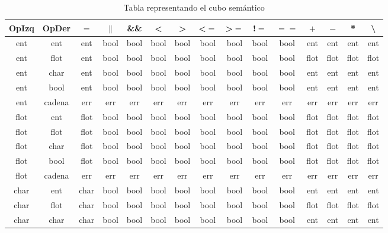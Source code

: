 \begin{table}
    \centering
    \caption{Tabla representando el cubo semántico}
    \small
    \begin{tabular}{||c c || c c c c c c c c c c c c c||} 
         
         OpIzq & OpDer & $=$ & $\parallel$ & \&\& & \textless & \textgreater & \textless $=$ & \textgreater $=$ & !$=$ & $==$ & $+$ & $-$ & * & \textbackslash \\ [0.5ex] 
         \hline\hline
         ent & ent & ent & bool & bool & bool & bool & bool & bool & bool & bool & ent & ent & ent & ent \\ 
         \hline
         ent & flot & ent & bool & bool & bool & bool & bool & bool & bool & bool & flot & flot & flot & flot \\ 
         \hline
         ent & char & ent & bool & bool & bool & bool & bool & bool & bool & bool & ent & ent & ent & ent \\ 
         \hline
         ent & bool & ent & bool & bool & bool & bool & bool & bool & bool & bool & ent & ent & ent & ent \\ 
         \hline
         ent & cadena & err & err & err & err & err & err & err & err & err & err & err & err & err \\ 
         \hline
         flot & ent & flot & bool & bool & bool & bool & bool & bool & bool & bool & flot & flot & flot & flot \\ 
         \hline
         flot & flot & flot & bool & bool & bool & bool & bool & bool & bool & bool & flot & flot & flot & flot \\ 
         \hline
         flot & char & flot & bool & bool & bool & bool & bool & bool & bool & bool & flot & flot & flot & flot \\ 
         \hline
         flot & bool & flot & bool & bool & bool & bool & bool & bool & bool & bool & flot & flot & flot & flot \\ 
         \hline
         flot & cadena & err & err & err & err & err & err & err & err & err & err & err & err & err \\ 
         \hline
         char & ent & char & bool & bool & bool & bool & bool & bool & bool & bool & ent & ent & ent & ent \\ 
         \hline
         char & flot & char & bool & bool & bool & bool & bool & bool & bool & bool & flot & flot & flot & flot \\ 
         \hline
         char & char & char & bool & bool & bool & bool & bool & bool & bool & bool & ent & ent & ent & ent \\ 

\end{tabular}
\end{table}
